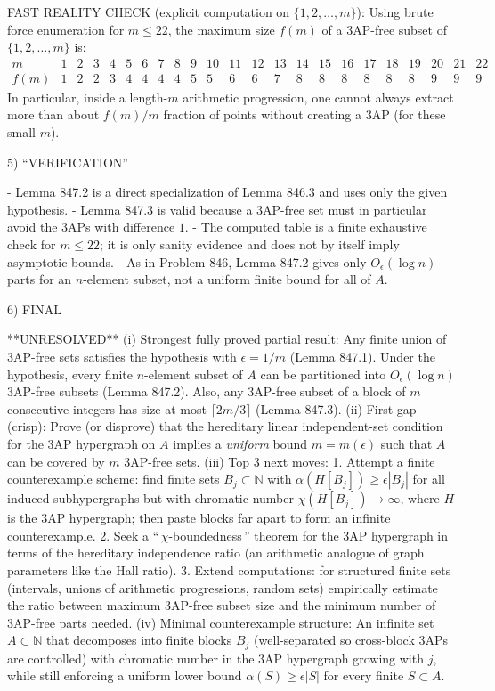 FAST REALITY CHECK (explicit computation on $\{1,2,\dots,m\}$):
Using brute force enumeration for $m\le 22$, the maximum size $f(m)$ of a 3AP-free subset of $\{1,2,\dots,m\}$ is:
\[
\begin{array}{c|cccccccccccccccccccccc}
 m & 1&2&3&4&5&6&7&8&9&10&11&12&13&14&15&16&17&18&19&20&21&22\\\hline
 f(m) & 1&2&2&3&4&4&4&4&5&5&6&6&7&8&8&8&8&8&8&9&9&9
\end{array}
\]
In particular, inside a length-$m$ arithmetic progression, one cannot always extract more than about $f(m)/m$ fraction of points without creating a 3AP (for these small $m$).

5) “VERIFICATION”

- Lemma 847.2 is a direct specialization of Lemma 846.3 and uses only the given hypothesis.
- Lemma 847.3 is valid because a 3AP-free set must in particular avoid the 3APs with difference $1$.
- The computed table is a finite exhaustive check for $m\le 22$; it is only sanity evidence and does not by itself imply asymptotic bounds.
- As in Problem 846, Lemma 847.2 gives only $O_\epsilon(\log n)$ parts for an $n$-element subset, not a uniform finite bound for all of $A$.

6) FINAL

**UNRESOLVED**
(i) Strongest fully proved partial result: Any finite union of 3AP-free sets satisfies the hypothesis with $\epsilon=1/m$ (Lemma 847.1). Under the hypothesis, every finite $n$-element subset of $A$ can be partitioned into $O_\epsilon(\log n)$ 3AP-free subsets (Lemma 847.2). Also, any 3AP-free subset of a block of $m$ consecutive integers has size at most $\lceil 2m/3\rceil$ (Lemma 847.3).
(ii) First gap (crisp): Prove (or disprove) that the hereditary linear independent-set condition for the 3AP hypergraph on $A$ implies a \emph{uniform} bound $m=m(\epsilon)$ such that $A$ can be covered by $m$ 3AP-free sets.
(iii) Top 3 next moves:
  1. Attempt a finite counterexample scheme: find finite sets $B_j\subset\mathbb{N}$ with $\alpha(H[B_j])\ge \epsilon|B_j|$ for all induced subhypergraphs but with chromatic number $\chi(H[B_j])\to\infty$, where $H$ is the 3AP hypergraph; then paste blocks far apart to form an infinite counterexample.
  2. Seek a “\,$\chi$-boundedness\,” theorem for the 3AP hypergraph in terms of the hereditary independence ratio (an arithmetic analogue of graph parameters like the Hall ratio).
  3. Extend computations: for structured finite sets (intervals, unions of arithmetic progressions, random sets) empirically estimate the ratio between maximum 3AP-free subset size and the minimum number of 3AP-free parts needed.
(iv) Minimal counterexample structure: An infinite set $A\subset\mathbb{N}$ that decomposes into finite blocks $B_j$ (well-separated so cross-block 3APs are controlled) with chromatic number in the 3AP hypergraph growing with $j$, while still enforcing a uniform lower bound $\alpha(S)\ge \epsilon|S|$ for every finite $S\subset A$.


